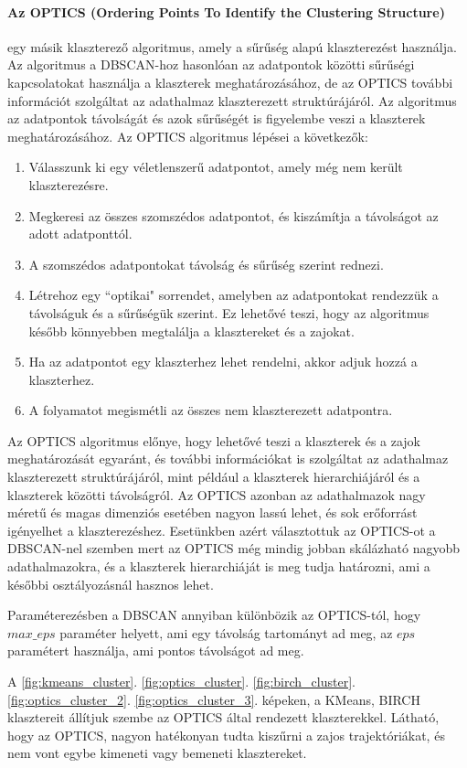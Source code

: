 \documentclass[12pt,a4paper]{article}
\begin{document}
\paragraph{Az OPTICS (Ordering Points To Identify the Clustering Structure)} egy másik klaszterező algoritmus, amely a sűrűség alapú klaszterezést használja. Az algoritmus a DBSCAN-hoz hasonlóan az adatpontok közötti sűrűségi kapcsolatokat használja a klaszterek meghatározásához, de az OPTICS további információt szolgáltat az adathalmaz klaszterezett struktúrájáról. Az algoritmus az adatpontok távolságát és azok sűrűségét is figyelembe veszi a klaszterek meghatározásához.
Az OPTICS algoritmus lépései a következők:
\begin{enumerate}
    \item Válasszunk ki egy véletlenszerű adatpontot, amely még nem került klaszterezésre.
    \item Megkeresi az összes szomszédos adatpontot, és kiszámítja a távolságot az adott adatponttól.
    \item A szomszédos adatpontokat távolság és sűrűség szerint rednezi.
    \item Létrehoz egy ``optikai" sorrendet, amelyben az adatpontokat rendezzük a távolságuk és a sűrűségük szerint. Ez lehetővé teszi, hogy az algoritmus később könnyebben megtalálja a klasztereket és a zajokat.
    \item Ha az adatpontot egy klaszterhez lehet rendelni, akkor adjuk hozzá a klaszterhez.
    \item A folyamatot megismétli az összes nem klaszterezett adatpontra.
\end{enumerate}
Az OPTICS algoritmus előnye, hogy lehetővé teszi a klaszterek és a zajok meghatározását egyaránt, és további információkat is szolgáltat az adathalmaz klaszterezett struktúrájáról, mint például a klaszterek hierarchiájáról és a klaszterek közötti távolságról. Az OPTICS azonban az adathalmazok nagy méretű és magas dimenziós esetében nagyon lassú lehet, és sok erőforrást igényelhet a klaszterezéshez.
Esetünkben azért választottuk az OPTICS-ot a DBSCAN-nel szemben mert az OPTICS még mindig jobban skálázható nagyobb adathalmazokra, és a klaszterek hierarchiáját is meg tudja határozni, ami a későbbi osztályozásnál hasznos lehet.

Paraméterezésben a DBSCAN annyiban különbözik az OPTICS-tól, hogy $max\_eps$ paraméter helyett, ami egy távolság tartományt ad meg, az $eps$ paramétert használja, ami pontos távolságot ad meg.

A \ref{fig:kmeans_cluster}. \ref{fig:optics_cluster}. \ref{fig:birch_cluster}. \ref{fig:optics_cluster_2}. \ref{fig:optics_cluster_3}. képeken, a KMeans, BIRCH klasztereit állítjuk szembe az OPTICS által rendezett klaszterekkel. Látható, hogy az OPTICS, nagyon hatékonyan tudta kiszűrni a zajos trajektóriákat, és nem vont egybe kimeneti vagy bemeneti klasztereket.
\end{document}
